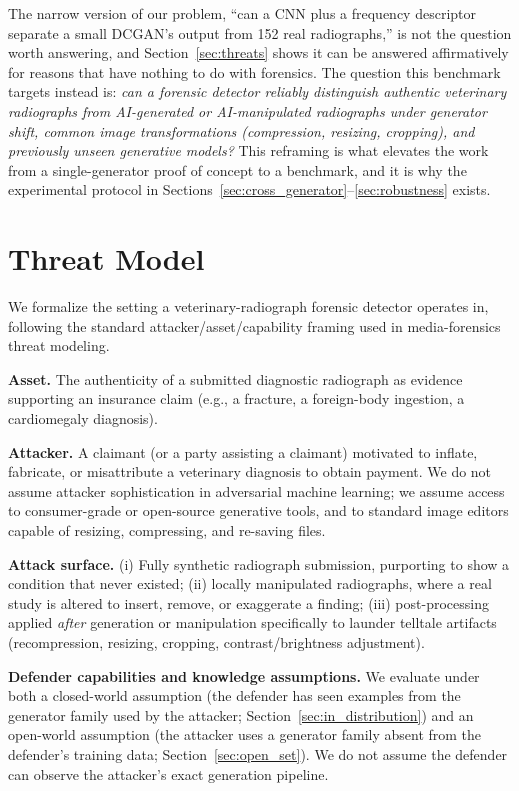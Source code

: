 \documentclass[journal]{IEEEtran}
\begin{document}
The narrow version of our problem, ``can a CNN plus a frequency descriptor separate a small DCGAN's output from 152 real radiographs,'' is not the question worth answering, and Section~\ref{sec:threats} shows it can be answered affirmatively for reasons that have nothing to do with forensics. The question this benchmark targets instead is: \emph{can a forensic detector reliably distinguish authentic veterinary radiographs from AI-generated or AI-manipulated radiographs under generator shift, common image transformations (compression, resizing, cropping), and previously unseen generative models?} This reframing is what elevates the work from a single-generator proof of concept to a benchmark, and it is why the experimental protocol in Sections~\ref{sec:cross_generator}--\ref{sec:robustness} exists.

\section{Threat Model}
\label{sec:threat_model}

We formalize the setting a veterinary-radiograph forensic detector operates in, following the standard attacker/asset/capability framing used in media-forensics threat modeling.

\textbf{Asset.} The authenticity of a submitted diagnostic radiograph as evidence supporting an insurance claim (e.g., a fracture, a foreign-body ingestion, a cardiomegaly diagnosis).

\textbf{Attacker.} A claimant (or a party assisting a claimant) motivated to inflate, fabricate, or misattribute a veterinary diagnosis to obtain payment. We do not assume attacker sophistication in adversarial machine learning; we assume access to consumer-grade or open-source generative tools, and to standard image editors capable of resizing, compressing, and re-saving files.

\textbf{Attack surface.} (i) Fully synthetic radiograph submission, purporting to show a condition that never existed; (ii) locally manipulated radiographs, where a real study is altered to insert, remove, or exaggerate a finding; (iii) post-processing applied \emph{after} generation or manipulation specifically to launder telltale artifacts (recompression, resizing, cropping, contrast/brightness adjustment).

\textbf{Defender capabilities and knowledge assumptions.} We evaluate under both a closed-world assumption (the defender has seen examples from the generator family used by the attacker; Section~\ref{sec:in_distribution}) and an open-world assumption (the attacker uses a generator family absent from the defender's training data; Section~\ref{sec:open_set}). We do not assume the defender can observe the attacker's exact generation pipeline.
\end{document}
